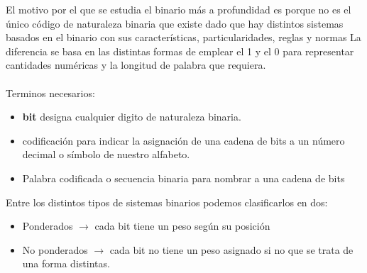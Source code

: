 \documentclass{article}
\begin{document}
El motivo por el que se estudia el binario más a profundidad es porque no es
el único código de naturaleza binaria que existe dado que hay distintos sistemas
basados en el binario con sus características, particularidades, reglas y normas
La diferencia se basa en las distintas formas de emplear el 1 y el 0
para representar cantidades numéricas y la longitud de palabra que requiera.\\\\

Terminos necesarios:
\begin{itemize}
    \item \textbf{bit} designa cualquier digito de naturaleza binaria.
    \item  codificación para indicar la asignación de una cadena de bits
    a un número decimal o símbolo de nuestro alfabeto.
    \item Palabra codificada o secuencia binaria para nombrar a una cadena de bits
\end{itemize}

Entre los distintos tipos de sistemas binarios podemos clasificarlos en dos:
\begin{itemize}
    \item Ponderados $\rightarrow$ cada bit tiene un peso según su posición
    \item No ponderados $\rightarrow$ cada bit no tiene un peso asignado si no que
    se trata de una forma distintas.
\end{itemize}
\end{document}
